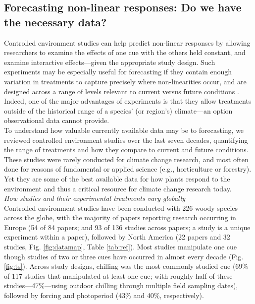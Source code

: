 \documentclass[11pt,letter]{article}
\begin{document}
\subsection{Forecasting non-linear responses: Do we have the necessary data?} %
Controlled environment studies can help predict non-linear responses by allowing researchers to examine the effects of one cue with the others held constant, and examine interactive effects---given the appropriate study design. Such experiments may be especially useful for forecasting if they contain enough variation in treatments to capture precisely where non-linearities occur, and are designed across a range of levels relevant to current versus future conditions \citep{shen2015}. Indeed, one of the major advantages of experiments is that they allow treatments outside of the historical range of a species' (or region's) climate---an option observational data cannot provide. \\

To understand how valuable currently available data may be to forecasting, we reviewed controlled environment studies over the last seven decades, quantifying the range of treatments and how they compare to current and future conditions. These studies were rarely conducted for climate change research, and most often done for reasons of fundamental or applied science (e.g., horticulture or forestry). Yet they are some of the best available data for how plants respond to the environment and thus a critical resource for climate change research today.\\

\emph{How studies and their experimental treatments vary globally}\\
Controlled environment studies have been conducted with 226 woody species across the globe, with the majority of papers reporting research occurring in Europe (54 of 84 papers; and 93 of 136 studies across papers; a study is a unique experiment within a paper), followed by North America (22 papers and 32 studies, Fig. \ref{fig:datamap}, Table \ref{tab:ref}). Most studies manipulate one cue though studies of two or three cues have occurred in almost every decade (Fig. \ref{fig:ts}). Across study designs, chilling was the most commonly studied cue (69\% of 117 studies that manipulated at least one cue; with roughly half of these studies---47\%---using outdoor chilling through multiple field sampling dates), followed by forcing and photoperiod (43\% and 40\%, respectively). \\
\end{document}

